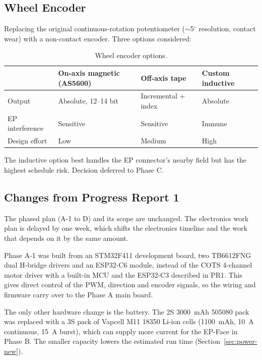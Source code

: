 \documentclass[12pt,a4paper]{article}
\begin{document}
\subsection{Wheel Encoder}

Replacing the original continuous-rotation potentiometer ($\sim$5$^\circ$ resolution, contact wear) with a non-contact encoder. Three options considered:

\begin{table}[H]
\centering\small
\caption{Wheel encoder options.}
\label{tab:encoders}
\begin{tabular}{@{}L{0.20\textwidth} L{0.24\textwidth} L{0.24\textwidth} L{0.24\textwidth}@{}}
\toprule
& \textbf{On-axis magnetic} (AS5600) & \textbf{Off-axis tape} & \textbf{Custom inductive} \\
\midrule
Output & Absolute, 12--14 bit & Incremental + index & Absolute \\
EP interference & Sensitive & Sensitive & Immune \\
Design effort & Low & Medium & High \\
\bottomrule
\end{tabular}
\end{table}

The inductive option best handles the EP connector's nearby field but has the highest schedule risk. Decision deferred to Phase C.

\subsection{Changes from Progress Report 1}
\label{sec:elec-changes}

The phased plan (A-1 to D) and its scope are unchanged. The electronics work
plan is delayed by one week, which shifts the electronics timeline and the
work that depends on it by the same amount.

Phase A-1 was built from an STM32F411 development board, two TB6612FNG
dual H-bridge drivers and an ESP32-C6 module, instead of the COTS 4-channel
motor driver with a built-in MCU and the ESP32-C3 described in PR1. This gives direct control of the PWM, direction
and encoder signals, so the wiring and firmware carry over to the Phase A main
board.

The only other hardware change is the battery. The 2S \SI{3000}{mAh} 505080 pack was
replaced with a 3S pack of Vapcell M11 18350 Li-ion cells (\SI{1100}{mAh},
\SI{10}{A} continuous, \SI{15}{A} burst), which can supply more current for the
EP-Face in Phase B. The smaller capacity lowers the estimated run time
(Section~\ref{sec:power-new}).
\end{document}
